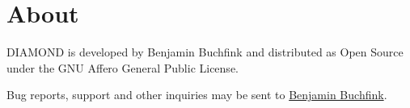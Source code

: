 \documentclass[11pt]{article}
\begin{document}
\section*{About}
DIAMOND is developed by Benjamin Buchfink and distributed as Open Source under the GNU Affero General Public License.

\noindent Bug reports, support and other inquiries may be sent to \href{mailto:buchfink@gmail.com}{Benjamin Buchfink}.



\end{document}
